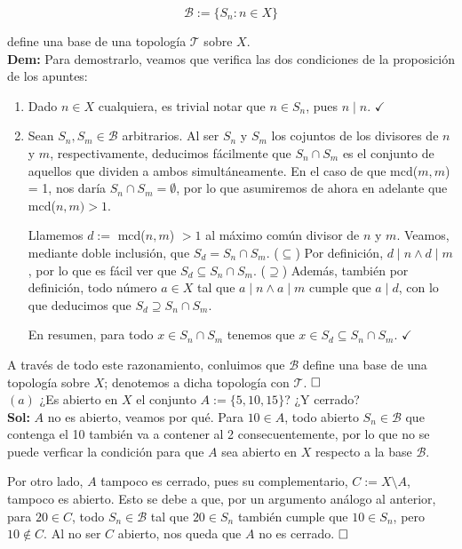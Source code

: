 \documentclass{article}
\begin{document}
\[\mathcal{B} := \{S_n : n \in X\}\]

\noindent define una base de una topología $\mathcal{T}$ sobre $X$. \\

\noindent\textbf{Dem:} Para demostrarlo, veamos que verifica las dos condiciones de la proposición de los apuntes:

\begin{enumerate}[label=(\textit{\roman*})]
  \item Dado $n \in X$ cualquiera, es trivial notar que $n \in S_n$, pues $n \mid n$. $\checkmark$
  \item Sean $S_n, S_m \in \mathcal{B}$ arbitrarios. Al ser $S_n$ y $S_m$ los cojuntos de los divisores de $n$ y $m$, respectivamente, deducimos fácilmente que $S_n \cap S_m$ es el conjunto de aquellos que dividen a ambos simultáneamente. En el caso de que mcd($m, m$) = 1, nos daría $S_n \cap S_m = \emptyset$, por lo que asumiremos de ahora en adelante que mcd($n, m) > 1$. 

  Llamemos $d :=$ mcd($n, m$) $> 1$ al máximo común divisor de $n$ y $m$. Veamos, mediante doble inclusión, que $S_d = S_n \cap S_m$. ($\subseteq$) Por definición, $d \mid n \land d \mid m$, por lo que es fácil ver que $S_d \subseteq S_n \cap S_m$. ($\supseteq$) Además, también por definición, todo número $a \in X$ tal que $a \mid n \land a \mid m$ cumple que $a \mid d$, con lo que deducimos que $S_d \supseteq S_n \cap S_m$.

  En resumen, para todo $x \in S_n \cap S_m$ tenemos que $x \in S_d \subseteq S_n \cap S_m$. $\checkmark$
\end{enumerate}

A través de todo este razonamiento, conluimos que $\mathcal{B}$ define una base de una topología sobre $X$; denotemos a dicha topología con $\mathcal{T}$. $\hfill\square$ \\

\noindent$(a)$ ¿Es abierto en $X$ el conjunto $A := \{5, 10, 15\}$? ¿Y cerrado? \\

\noindent\textbf{Sol:} $A$ no es abierto, veamos por qué. Para $10 \in A$, todo abierto $S_n \in \mathcal{B}$ que contenga el 10 también va a contener al 2 consecuentemente, por lo que no se puede verficar la condición para que $A$ sea abierto en $X$ respecto a la base $\mathcal{B}$.

Por otro lado, $A$ tampoco es cerrado, pues su complementario, $C := X \setminus A$, tampoco es abierto. Esto se debe a que, por un argumento análogo al anterior, para $20 \in C$, todo $S_n \in \mathcal{B}$ tal que $20 \in S_n$ también cumple que $10 \in S_n$, pero $10 \notin C$. Al no ser $C$ abierto, nos queda que $A$ no es cerrado. $\hfill\square$ \\
\end{document}

